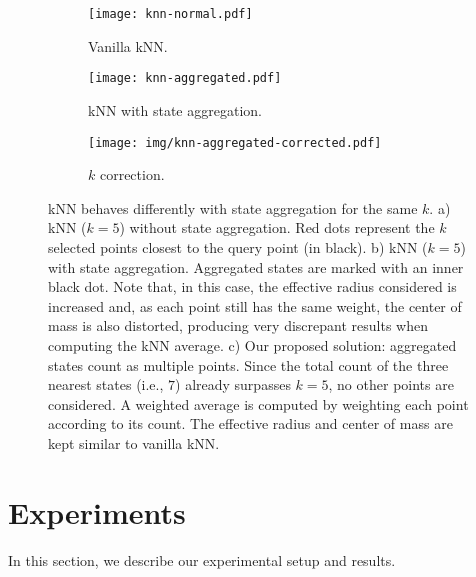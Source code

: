 \documentclass{article}
\begin{document}
\begin{figure}[htb]
    \centering
    \begin{subfigure}{.3\textwidth}
        \centering
        \texttt{[image: knn-normal.pdf]}
        \caption{Vanilla kNN.}
        \label{fig:knn1}
    \end{subfigure}
    \begin{subfigure}{.3\textwidth}
        \centering
        \texttt{[image: knn-aggregated.pdf]}
        \caption{kNN with state aggregation.}
        \label{fig:knn2}
    \end{subfigure}
    \begin{subfigure}{.3\textwidth}
        \centering
        \texttt{[image: img/knn-aggregated-corrected.pdf]}
        \caption{$k$ correction.}
        \label{fig:knn3}
    \end{subfigure}
    \caption{kNN behaves differently with state aggregation for the same $k$. a) kNN ($k=5$) without state aggregation. Red dots represent the $k$ selected points closest to the query point (in black). b) kNN ($k=5$) with state aggregation. Aggregated states are marked with an inner black dot. Note that, in this case, the effective radius considered is increased and, as each point still has the same weight, the center of mass is also distorted, producing very discrepant results when computing the kNN average. c) Our proposed solution: aggregated states count as multiple points. Since the total count of the three nearest states (i.e., $7$) already surpasses $k=5$, no other points are considered. A weighted average is computed by weighting each point according to its count. The effective radius and center of mass are kept similar to vanilla kNN.}
    \label{fig:knn}
\end{figure}


\section{Experiments}
\label{sec:experiments}

In this section, we describe our experimental setup and results.
\end{document}
